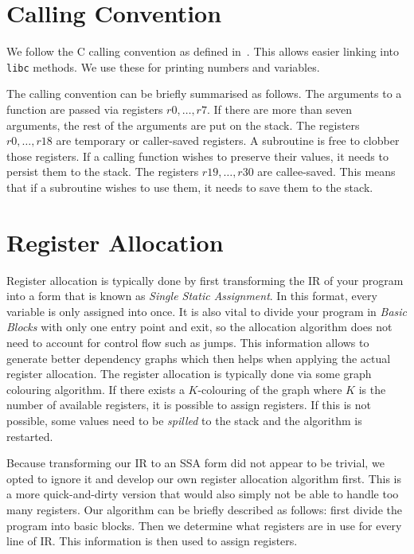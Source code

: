 \section{Calling Convention}

We follow the C calling convention as defined in~\cite{callingconvention}.
This allows easier linking into \texttt{libc} methods.
We use these for printing numbers and variables.

The calling convention can be briefly summarised as follows.
The arguments to a function are passed via registers $r0, \ldots, r7$.
If there are more than seven arguments, the rest of the arguments are put on the stack.
The registers $r0, \ldots, r18$ are temporary or caller-saved registers.
A subroutine is free to clobber those registers.
If a calling function wishes to preserve their values, it needs to persist them to the stack.
The registers $r19, \ldots, r30$ are callee-saved.
This means that if a subroutine wishes to use them, it needs to save them to the stack.

\section{Register Allocation}

Register allocation is typically done by first transforming the IR of your program into a form that is known as \emph{Single Static Assignment}.
In this format, every variable is only assigned into once.
It is also vital to divide your program in \emph{Basic Blocks} with only one entry point and exit, so the allocation algorithm does not need to account for control flow such as jumps.
This information allows to generate better dependency graphs which then helps when applying the actual register allocation.
The register allocation is typically done via some graph colouring algorithm.
If there exists a $K$-colouring of the graph where $K$ is the number of available registers, it is possible to assign registers.
If this is not possible, some values need to be \emph{spilled} to the stack and the algorithm is restarted.

Because transforming our IR to an SSA form did not appear to be trivial, we opted to ignore it and develop our own register allocation algorithm first.
This is a more quick-and-dirty version that would also simply not be able to handle too many registers.
Our algorithm can be briefly described as follows: first divide the program into basic blocks.
Then we determine what registers are in use for every line of IR\@.
This information is then used to assign registers.

